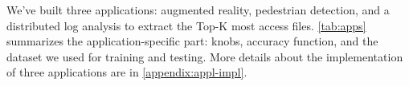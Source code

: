 




We've built three applications: augmented reality, pedestrian detection, and a
distributed log analysis to extract the Top-K most access
files. \autoref{tab:apps} summarizes the application-specific part: knobs,
accuracy function, and the dataset we used for training and testing. More
details about the implementation of three applications are in
\autoref{appendix:appl-impl}.

